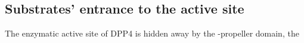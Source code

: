 \subsection{Substrates' entrance to the active site}

The enzymatic active site of DPP4 is hidden away by the \beta-propeller domain, the 